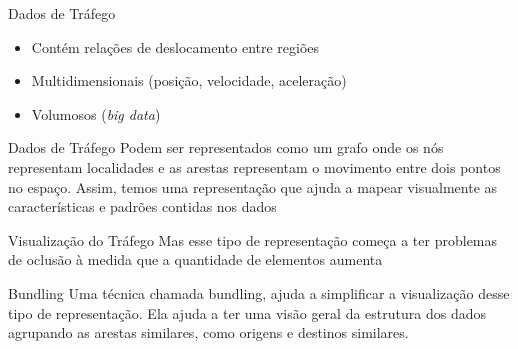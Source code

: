 
\begin{frame}{Dados de Tráfego}
  \begin{itemize}
    \item Contém relações de deslocamento entre regiões
    \item Multidimensionais (posição, velocidade, aceleração)
    \item Volumosos (\emph{big data})
  \end{itemize}
\end{frame}

\begin{frame}{Dados de Tráfego}
  Podem ser representados como um grafo onde os nós representam localidades e
as arestas representam o movimento entre dois pontos no espaço. Assim, temos
uma representação que ajuda a mapear visualmente as características e padrões
contidas nos dados
\end{frame}

\begin{frame}{Visualização do Tráfego}
  Mas esse tipo de representação começa a ter problemas de oclusão à medida
que a quantidade de elementos aumenta
\end{frame}

\begin{frame}{Bundling}
  Uma técnica chamada bundling, ajuda a simplificar a visualização desse tipo
de representação. Ela ajuda a ter uma visão geral da estrutura dos dados
agrupando as arestas similares, como origens e destinos similares.
\end{frame}


